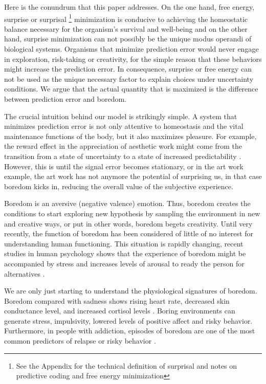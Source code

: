 \documentclass[11pt,twocolumn]{article}
\begin{document}
Here is the conundrum that this paper addresses. On the one hand, free energy, surprise or surprisal \footnote{See the Appendix for the technical definition of surprisal and notes on predictive coding and free energy minimization} minimization is conducive to achieving the homeostatic balance necessary for the organism's survival and well-being and on the other hand, surprise minimization can not possibly be the unique modus operandi of biological systems. Organisms that minimize prediction error would never engage in exploration, risk-taking or creativity, for the simple reason that these behaviors might increase the prediction error. 
In consequence, surprise or free energy can not be used as the unique necessary factor to explain choices under uncertainty conditions. We argue that the actual quantity that is maximized is the difference between prediction error and boredom. 

The crucial intuition behind our model is strikingly simple.
A system that minimizes prediction error is not only attentive to homeostasis and the vital maintenance functions of the body, but it also maximizes pleasure. For example, the reward effect in the appreciation of aesthetic work might come from the transition from a state of uncertainty to a state of increased predictability \citep{van_de_cruys_putting_2011}.
However, this is until the signal error becomes stationary, or in the art work example, the art work has not anymore the potential of surprising us, in that case boredom kicks in, reducing the overall value of the subjective experience.

Boredom is an aversive (negative valence) emotion. Thus, boredom creates the conditions to start exploring new hypothesis by sampling the environment in new and creative ways, or put in other words, boredom begets creativity. 
Until very recently, the function of boredom has been considered of little of no interest for understanding human functioning. This situation is rapidly changing, 
recent studies in human psychology shows that the experience of boredom might be accompanied by stress and increases levels of arousal to ready the person for alternatives \citep{posner_neurophysiological_2009} \citep{bench_function_2013}. 

We are only just starting to understand the physiological signatures of boredom. Boredom compared with sadness shows rising heart rate, decreased skin conductance level, and increased cortisol levels  \citep{merrifield_characterizing_2014}. Boring environments can generate stress, impulsivity, lowered levels of positive affect and risky behavior. Furthermore, in people with addiction, episodes of boredom are one of the most common predictors of relapse or risky behavior \citep{blaszczynski_boredom_1990}.
\end{document}
